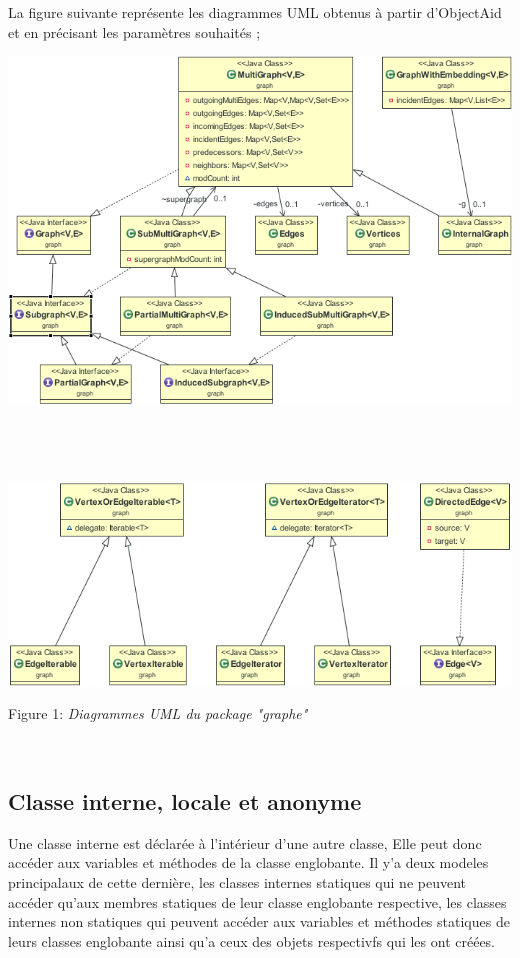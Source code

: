 \documentclass[12pt]{report}
\begin{document}
La figure suivante représente les diagrammes UML obtenus à partir d'ObjectAid et en précisant les paramètres souhaités ;
\newpage

\begin{center}
\includegraphics[width=1\textwidth]{DiagUMLPartie1.png}
\caption{\label{fig:DiagUMLPartie1}}
~\\
~\\
~\\
\includegraphics[width=1\textwidth]{DiagUMLPartie2.png}
\caption{\label{fig:DiagUMLPartie2}\newline Figure 1: \textit{Diagrammes UML du package "graphe" }}
\end{center}

\newpage
~\\
\subsection{Classe interne, locale et anonyme}

Une classe interne est déclarée à l'intérieur d'une autre classe, Elle peut donc accéder aux variables et méthodes de la classe englobante. Il y'a deux modeles principalaux de cette dernière, les classes internes statiques qui ne peuvent accéder qu'aux membres statiques de leur classe englobante respective, les classes internes non statiques qui peuvent accéder aux variables et méthodes statiques de leurs classes englobante ainsi qu'a ceux des objets respectivfs qui les ont créées.\newline
\end{document}
